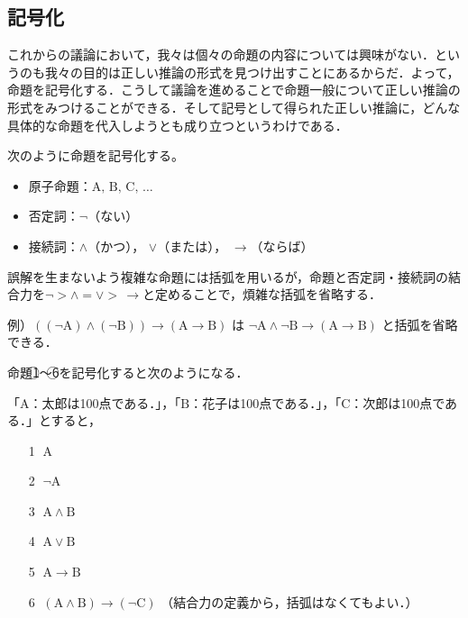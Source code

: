\documentclass[10pt,b5paper,papersize,dvipdfmx]{jsbook}
\newcommand\rmA{\mathrm{A}}
\newcommand\rmB{\mathrm{B}}
\newcommand\rmC{\mathrm{C}}
\newcommand\maru[1]{\textcircled{\scriptsize{}#1}}
\begin{document}
\subsection{記号化}
これからの議論において，我々は個々の命題の内容については興味がない．というのも我々の目的は正しい推論の形式を見つけ出すことにあるからだ．よって，命題を記号化する．こうして議論を進めることで命題一般について正しい推論の形式をみつけることができる．そして記号として得られた正しい推論に，どんな具体的な命題を代入しようとも成り立つというわけである．\par
次のように命題を記号化する。
\begin{itemize}
  \item 原子命題：$\rmA,\, \rmB,\, \rmC,\, \dots$
  \item 否定詞：$\lnot$（ない）
  \item 接続詞：$\land$（かつ）， $\lor$（または）， $\to$（ならば）
\end{itemize}
誤解を生まないよう複雑な命題には括弧を用いるが，命題と否定詞・接続詞の結合力を$\lnot > \land = \lor > \,\to$と定めることで，煩雑な括弧を省略する．\par
例）$((\lnot \rmA) \land (\lnot \rmB)) \to (\rmA \to \rmB)$ は $\lnot \rmA \land \lnot \rmB \to (\rmA \to \rmB)$ と括弧を省略できる．\par
命題\maru{1}～\maru{6}を記号化すると次のようになる．\par
「$\rmA$：太郎は100点である．」，「$\rmB$：花子は100点である．」，「$\rmC$：次郎は100点である．」とすると，
\begin{itemize} %
  \item[\maru{1}] $\rmA$
  \item[\maru{2}] $\lnot \rmA$
  \item[\maru{3}] $\rmA \land \rmB$
  \item[\maru{4}] $\rmA \lor \rmB$
  \item[\maru{5}] $\rmA \to \rmB$
  \item[\maru{6}] $(\rmA \land \rmB) \to (\lnot \rmC)$ （結合力の定義から，括弧はなくてもよい．）
\end{itemize}
\end{document}
